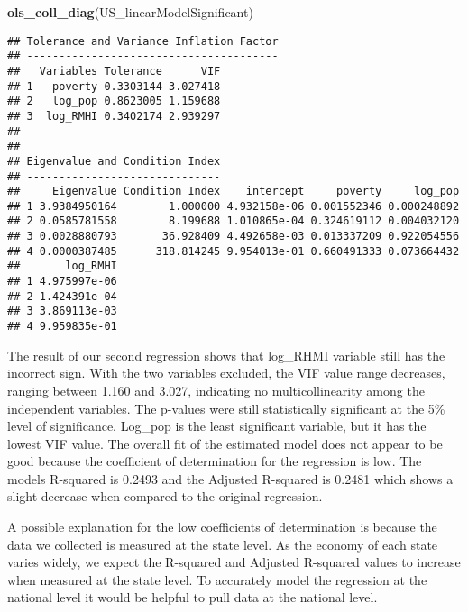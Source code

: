 \documentclass[
]{article}
\newenvironment{Shaded}{\begin{snugshade}}{\end{snugshade}}
\newcommand{\CharTok}[1]{\textcolor[rgb]{0.31,0.60,0.02}{#1}}
\newcommand{\DataTypeTok}[1]{\textcolor[rgb]{0.13,0.29,0.53}{#1}}
\newcommand{\DecValTok}[1]{\textcolor[rgb]{0.00,0.00,0.81}{#1}}
\newcommand{\KeywordTok}[1]{\textcolor[rgb]{0.13,0.29,0.53}{\textbf{#1}}}
\newcommand{\NormalTok}[1]{#1}
\newcommand{\OperatorTok}[1]{\textcolor[rgb]{0.81,0.36,0.00}{\textbf{#1}}}
\newcommand{\StringTok}[1]{\textcolor[rgb]{0.31,0.60,0.02}{#1}}
\begin{document}
\begin{Shaded}
\begin{Highlighting}[]
\KeywordTok{ols_coll_diag}\NormalTok{(US_linearModelSignificant)}
\end{Highlighting}
\end{Shaded}

\begin{verbatim}
## Tolerance and Variance Inflation Factor
## ---------------------------------------
##   Variables Tolerance      VIF
## 1   poverty 0.3303144 3.027418
## 2   log_pop 0.8623005 1.159688
## 3  log_RMHI 0.3402174 2.939297
## 
## 
## Eigenvalue and Condition Index
## ------------------------------
##     Eigenvalue Condition Index    intercept     poverty     log_pop
## 1 3.9384950164        1.000000 4.932158e-06 0.001552346 0.000248892
## 2 0.0585781558        8.199688 1.010865e-04 0.324619112 0.004032120
## 3 0.0028880793       36.928409 4.492658e-03 0.013337209 0.922054556
## 4 0.0000387485      318.814245 9.954013e-01 0.660491333 0.073664432
##       log_RMHI
## 1 4.975997e-06
## 2 1.424391e-04
## 3 3.869113e-03
## 4 9.959835e-01
\end{verbatim}

The result of our second regression shows that log\_RHMI variable still
has the incorrect sign. With the two variables excluded, the VIF value
range decreases, ranging between 1.160 and 3.027, indicating no
multicollinearity among the independent variables. The p-values were
still statistically significant at the 5\% level of significance.
Log\_pop is the least significant variable, but it has the lowest VIF
value. The overall fit of the estimated model does not appear to be good
because the coefficient of determination for the regression is low. The
models R-squared is 0.2493 and the Adjusted R-squared is 0.2481 which
shows a slight decrease when compared to the original regression.

A possible explanation for the low coefficients of determination is
because the data we collected is measured at the state level. As the
economy of each state varies widely, we expect the R-squared and
Adjusted R-squared values to increase when measured at the state level.
To accurately model the regression at the national level it would be
helpful to pull data at the national level.

\begin{Shaded}
\end{Shaded}
\end{document}
